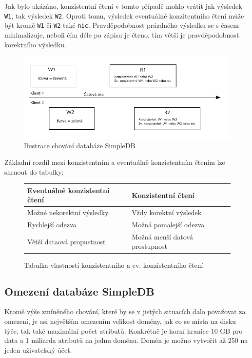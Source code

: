 \documentclass[oneside,12pt,final]{fithesis2}
\begin{document}
Jak bylo ukázáno, konzistentní čtení v tomto případě mohlo vrátit jak výsledek \verb<W1<, tak výsledek \verb<W2<. Oproti tomu, výsledek eventuálně konzitentního čtení může být kromě \verb<W1< či \verb<W2< také \verb<nic<. Pravděpodobnost prázdného výsledku se s časem minimalizuje, neboli čím déle po zápisu je čteno, tím větší je pravděpodobnost korektního výsledku.
\begin{figure}[h]
 \centering
 \includegraphics[scale=0.9]{ConsistencyExample}
 \caption{Ilustrace chování databáze SimpleDB}
\end{figure}

Základní rozdíl mezi konzistentním a eventuálně konzistentním čtením lze shrnout do tabulky:
\begin{figure}[h]
 \vspace{5mm}
 \begin{tabular}{l|l}
    Eventuálně konzistentní čtení & Konzistentní čtení\\ \hline
    Možné nekorektní výsledky & Vždy korektní výsledek\\ 
    Rychlejší odezva & Možná pomalejší odezva \\
    Větší dataová propustnost & Možná menší datová prostupnost
 \end{tabular}
 \caption{Tabulka vlastností konzistentního a ev. konzistentního čtení}
\end{figure}

\subsection{Omezení databáze SimpleDB}
Kromě výše zmíněného chování, které by se v jistých situacích dalo považovat za omezení, je asi největším omezením velikost domény, jak co se místa na disku týče, tak také maximální počet atributů. Konkrétně je horní hranice 10 GB pro data a 1 miliarda atributů na jednu doménu. Domén je možno vytvořit až 250 na jeden uživatelský účet.
\end{document}
